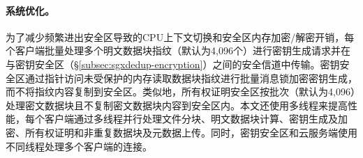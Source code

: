 \paragraph*{系统优化。}为了减少频繁进出安全区导致的CPU上下文切换和安全区内存加密/解密开销，每个客户端批量处理多个明文数据块指纹（默认为4,096个）进行密钥生成请求并在与密钥安全区（\S\ref{subsec:sgxdedup-encryption}）之间的安全信道中传输。密钥安全区通过指针访问未受保护的内存读取数据块指纹进行批量消息锁加密密钥生成，而不将指纹内容复制到安全区\cite{harnik2018SGX}。类似地，所有权证明安全区按批次（默认为4,096）处理密文数据块且不复制密文数据块内容到安全区内。本文还使用多线程来提高性能，每个客户端通过多线程并行处理文件分块、明文数据块计算、密钥生成及加密、所有权证明和非重复数据块及元数据上传。同时，密钥安全区和云服务端使用不同线程处理多个客户端的连接。